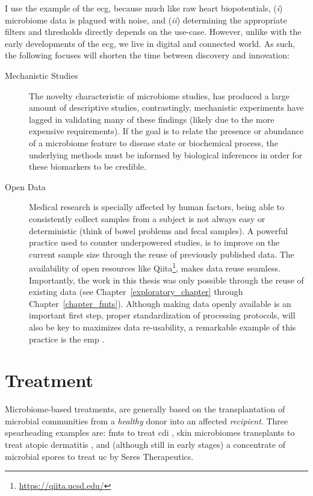 I use the example of the \gls{ecg}, because much like raw heart biopotentials,
(\textit{i}) microbiome data is plagued with noise, and (\textit{ii})
determining the appropriate filters and thresholds directly depends on the
use-case. However, unlike with the early developments of the \gls{ecg}, we live
in digital and connected world. As such, the following focuses will
shorten the time between discovery and innovation:

\begin{description}

  \item[Mechanistic Studies]The novelty characteristic of microbiome studies,
  has produced a large amount of descriptive studies, contrastingly,
  mechanistic experiments have lagged in validating many of these findings 
  (likely due to the more expensive requirements).  If the goal is to relate 
  the presence or abundance of a microbiome feature to disease state or 
  biochemical process, the underlying methods must be informed
  by biological inferences in order for these biomarkers to be credible.

  \item[Open Data]Medical research is specially affected by human factors,
  being able to consistently collect samples from a subject is not always easy
  or deterministic (think of bowel problems and fecal samples). A powerful
  practice used to counter underpowered studies, is to improve on the current
  sample size through the reuse of previously published data. The availability
  of open resources like Qiita\footnote{\url{https://qiita.ucsd.edu/}}, makes
  data reuse seamless. Importantly, the work in this thesis was only possible
  through the reuse of existing data (see Chapter~\ref{exploratory_chapter}
  through Chapter~\ref{chapter_fmts}).
  Although making data openly available is an important first step, proper
  standardization of processing protocols, will also be key to maximizes data 
  re-usability, a remarkable example of this practice is the \gls{emp} 
  \cite{RN4267}.

\end{description}

\section{Treatment}

Microbiome\hyp{}based treatments, are generally based on the transplantation of 
microbial communities from a \textit{healthy} donor into an affected 
\textit{recipient}. Three spearheading examples are: \glspl{fmt} to treat 
\gls{cdi} \cite{RN4129}, skin microbiomes transplants to treat atopic 
dermatitis \cite{GalloSkin}, and (although still in early stages) a concentrate 
of microbial spores to treat \gls{uc} by Seres Therapeutics.

